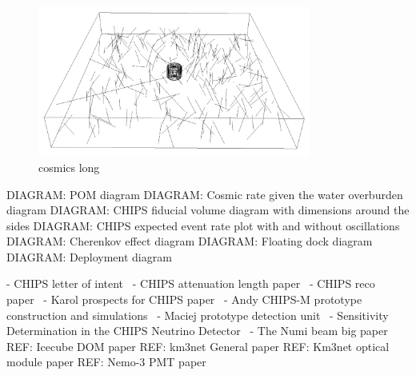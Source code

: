 \begin{figure} %
    \includegraphics[width=0.8\textwidth]{diagrams/4-chips/cosmics.png}
    \caption[cosmics short]
    {cosmics long}
    \label{fig:cosmics}
\end{figure} %

DIAGRAM: POM diagram
DIAGRAM: Cosmic rate given the water overburden diagram
DIAGRAM: CHIPS fiducial volume diagram with dimensions around the sides
DIAGRAM: CHIPS expected event rate plot with and without oscillations
DIAGRAM: Cherenkov effect diagram
DIAGRAM: Floating dock diagram
DIAGRAM: Deployment diagram

- CHIPS letter of intent~\cite{adamson2013}
- CHIPS attenuation length paper~\cite{amat2017}
- CHIPS reco paper~\cite{blake2016}
- Karol prospects for CHIPS paper~\cite{lang2015}
- Andy CHIPS-M prototype construction and simulations~\cite{perch2015}
- Maciej prototype detection unit~\cite{pfutznerProto2017}
- Sensitivity Determination in the CHIPS Neutrino Detector~\cite{adde2016}
- The Numi beam big paper~\cite{adamson2016}
REF: Icecube DOM paper
REF: km3net General paper
REF: Km3net optical module paper
REF: Nemo-3 PMT paper